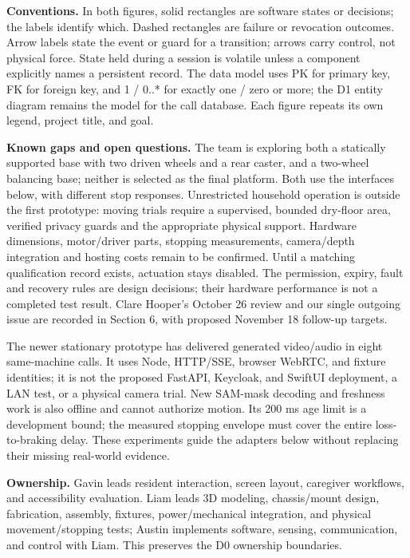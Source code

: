 \documentclass[12pt,letterpaper]{article}
\begin{document}
\textbf{Conventions.} In both figures, solid rectangles are software states or decisions; the labels identify which. Dashed rectangles are failure or revocation outcomes. Arrow labels state the event or guard for a transition; arrows carry control, not physical force. State held during a session is volatile unless a component explicitly names a persistent record. The data model uses PK for primary key, FK for foreign key, and 1 / 0..* for exactly one / zero or more; the D1 entity diagram remains the model for the call database. Each figure repeats its own legend, project title, and goal.

\textbf{Known gaps and open questions.} The team is exploring both a statically supported base with two driven wheels and a rear caster, and a two-wheel balancing base; neither is selected as the final platform. Both use the interfaces below, with different stop responses. Unrestricted household operation is outside the first prototype: moving trials require a supervised, bounded dry-floor area, verified privacy guards and the appropriate physical support. Hardware dimensions, motor/driver parts, stopping measurements, camera/depth integration and hosting costs remain to be confirmed. Until a matching qualification record exists, actuation stays disabled. The permission, expiry, fault and recovery rules are design decisions; their hardware performance is not a completed test result. Clare Hooper's October 26 review and our single outgoing issue are recorded in Section 6, with proposed November 18 follow-up targets.

The newer stationary prototype has delivered generated video/audio in eight same-machine calls. It uses Node, HTTP/SSE, browser WebRTC, and fixture identities; it is not the proposed FastAPI, Keycloak, and SwiftUI deployment, a LAN test, or a physical camera trial. New SAM-mask decoding and freshness work is also offline and cannot authorize motion. Its 200 ms age limit is a development bound; the measured stopping envelope must cover the entire loss-to-braking delay. These experiments guide the adapters below without replacing their missing real-world evidence.

\textbf{Ownership.} Gavin leads resident interaction, screen layout, caregiver workflows, and accessibility evaluation. Liam leads 3D modeling, chassis/mount design, fabrication, assembly, fixtures, power/mechanical integration, and physical movement/stopping tests; Austin implements software, sensing, communication, and control with Liam. This preserves the D0 ownership boundaries.
\end{document}
